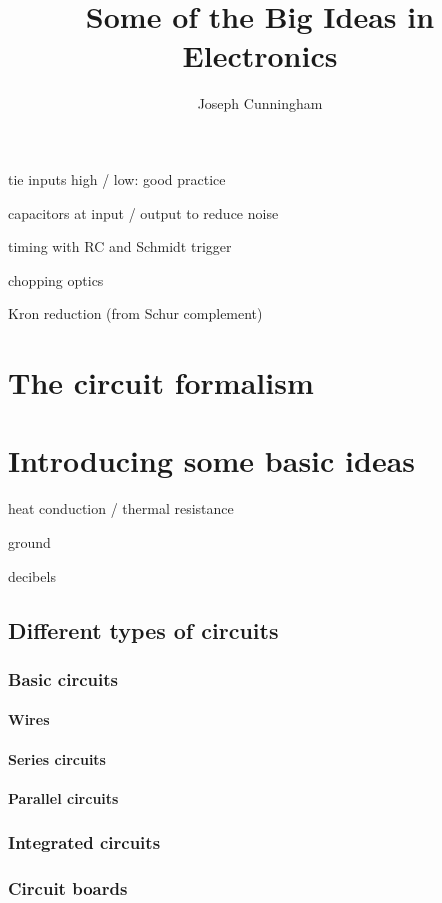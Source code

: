 \documentclass{report}
\title{Some of the Big Ideas in Electronics}
\author{Joseph Cunningham}
\date{}
\begin{document}
\maketitle
\tableofcontents

tie inputs high / low: good practice

capacitors at input / output to reduce noise

timing with RC and Schmidt trigger

chopping optics

Kron reduction (from Schur complement)

\part{The circuit formalism}
\setcounter{chapter}{0} %



\part{Introducing some basic ideas}
heat conduction / thermal resistance

ground

decibels


\chapter{Different types of circuits}
\section{Basic circuits}
\subsection{Wires}
\subsection{Series circuits}
\subsection{Parallel circuits}
\section{Integrated circuits}
\section{Circuit boards}
\end{document}
